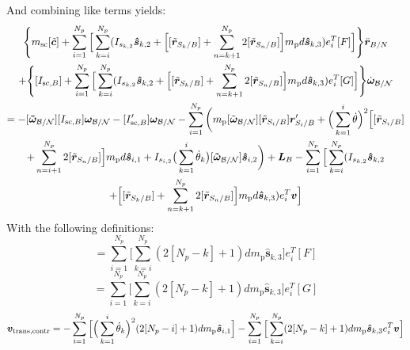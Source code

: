 And combining like terms yields:
\begin{multline}
	\Bigg \lbrace m_{\text{sc}} [\tilde{\bm{c}}] + \sum\limits_{i=1}^{N_p} \Big[\sum^{N_p}_{k=i} (I_{s_{k,2}} \bm{\hat{s}}_{k,2} + \Big[ [\tilde{{\bm r}}_{S_{k}/B}] + \sum\limits_{n=k+1}^{N_p}2[\tilde{{\bm r}}_{S_{n}/B}]\Big]m_{\text{p}} d \bm{\hat{s}}_{k,3} ) e_{i}^T[F] \Big] \Bigg \rbrace \ddot{\bm r}_{B/N} \\
	+ \Bigg \lbrace [I_{\text{sc},B}] + \sum\limits_{i=1}^{N_p} \Big[\sum^{N_p}_{k=i} (I_{s_{k,2}} \bm{\hat{s}}_{k,2} + \Big[ [\tilde{{\bm r}}_{S_{k}/B}] + \sum\limits_{n=k+1}^{N_p}2[\tilde{{\bm r}}_{S_{n}/B}]\Big]m_{\text{p}} d \bm{\hat{s}}_{k,3} ) e_{i}^T[G] \Big] \Bigg \rbrace \dot{\bm\omega}_{\cal B/N} \\
	= -[\bm{\tilde{\omega}}_{\cal B/N}] [I_{\text{sc},B}] \bm\omega_{\cal B/N} - [I'_{\text{sc},B}] \bm\omega_{\cal B/N} - \sum\limits_{i=1}^{N_p}\bigg( m_{\text{p}} [\tilde{\bm\omega}_{\cal B/N}] [\tilde{{\bm r}}_{S_{i}/B}] \bm{r}'_{S_i/B} + \Big( \sum\limits_{k=1}^{i} \dot{\theta}\Big)^2 \Big[[\tilde{{\bm r}}_{S_{i}/B}] \\
	+ \sum\limits_{n=i+1}^{N_p}2[\tilde{{\bm r}}_{S_{n}/B}]\Big] m_{\text{p}} d \bm{\hat{s}}_{i,1}
	+ I_{s_{i,2}} \big(\sum^{i}_{k=1}\dot{\theta}_k\big) [\bm{\tilde{\omega}}_{\cal B/N}] \bm{\hat{s}}_{i,2} \bigg) + \bm L_B - \sum\limits_{i=1}^{N_p} \Big[\sum^{N_p}_{k=i} (I_{s_{k,2}} \bm{\hat{s}}_{k,2} \\+ \Big[ [\tilde{{\bm r}}_{S_{k}/B}] + \sum\limits_{n=k+1}^{N_p}2[\tilde{{\bm r}}_{S_{n}/B}]\Big]m_{\text{p}} d \bm{\hat{s}}_{k,3} ) e_{i}^T \bm v \Big]
	\label{eq:Final8}
\end{multline}
With the following definitions:
\begin{equation}
	[A_{\text{contr}}] = \sum^{N_p}_{i=1} \Big[\sum^{N_p}_{k=i} (2[N_p-k]+1) d m_{\text{p}} \bm{\hat{s}}_{k,3}\Big] e_{i}^T[F]  
\end{equation}
\begin{equation}
	[B_{\text{contr}}] =  \sum^{N_p}_{i=1} \Big[\sum^{N_p}_{k=i} (2[N_p-k]+1) d m_{\text{p}} \bm{\hat{s}}_{k,3}\Big] e_{i}^T[G]
\end{equation}
\begin{equation}
	\bm v_{\text{trans,contr}} = -\sum^{N_p}_{i=1} \Big[ \Big(\sum^{i}_{k=1}\dot{\theta}_k\Big)^2 (2[N_p-i]+1) d m_{\text{p}} \bm{\hat{s}}_{i,1} \Big]\\
	- \sum^{N_p}_{i=1} \Big[\sum^{N_p}_{k=i} (2[N_p-k]+1) d m_{\text{p}} \bm{\hat{s}}_{k,3} e_{i}^T \bm v \Big] 
\end{equation}
